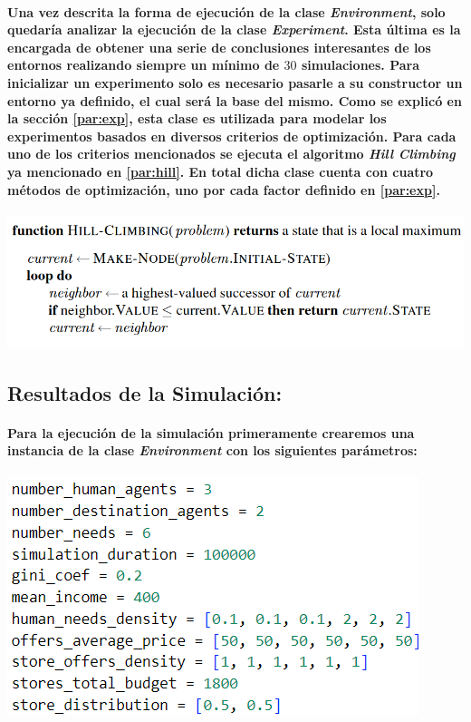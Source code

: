 \documentclass[12pt]{amsart}
\begin{document}
\paragraph{Una vez descrita la forma de ejecución de la clase \textit{Environment}, solo quedaría analizar la ejecución de la clase \textit{Experiment}. Esta última es la encargada de obtener una serie de conclusiones interesantes de los entornos realizando siempre un mínimo de $30$ simulaciones. Para inicializar un experimento solo es necesario pasarle a su constructor un entorno ya definido, el cual será la base del mismo. Como se explicó en la sección \ref{par:exp}, esta clase es utilizada para modelar los experimentos basados en diversos criterios de optimización. Para cada uno de los criterios mencionados se ejecuta el algoritmo \textit{Hill Climbing} ya mencionado en \ref{par:hill}. En total dicha clase cuenta con cuatro métodos de optimización, uno por cada factor definido en \ref{par:exp}.}

\begin{center}
	\includegraphics[scale=0.7]{./images/hillclimbp.png}
	\label{fig:hillclimbp}
\end{center}

\subsection{Resultados de la Simulación:}

\paragraph{Para la ejecución de la simulación primeramente crearemos una instancia de la clase \textit{Environment} con los siguientes parámetros:}

\begin{center}
	\includegraphics[scale=0.7]{./images/envparams.png}
	\label{fig:envparams}
\end{center}
\end{document}
